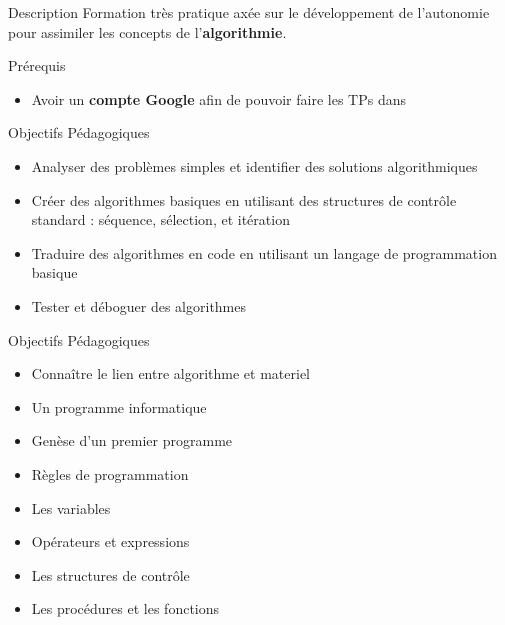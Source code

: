 \begin{frame}{Description}
  Formation très pratique axée sur le développement de l'autonomie 
  pour assimiler les concepts de l'\textbf{algorithmie}.
\end{frame}

\begin{frame}{Prérequis}
  \begin{itemize}
    \item Avoir un \textbf{compte Google} afin de pouvoir faire les TPs dans 
  \end{itemize}
\end{frame}

\begin{frame}{Objectifs Pédagogiques}
  \begin{itemize}
    \item Analyser des problèmes simples et identifier des solutions algorithmiques
    \item Créer des algorithmes basiques en utilisant des structures de contrôle standard : séquence, sélection, et itération
    \item Traduire des algorithmes en code en utilisant un langage de programmation basique
    \item Tester et déboguer des algorithmes
  \end{itemize}
\end{frame}

\begin{frame}{Objectifs Pédagogiques}
  \begin{itemize} 
    \item Connaître le lien entre algorithme et materiel
    \item Un programme informatique
    \item Genèse d'un premier programme
    \item Règles de programmation
    \item Les variables
    \item Opérateurs et expressions
    \item Les structures de contrôle
    \item Les procédures et les fonctions
  \end{itemize}
\end{frame}

